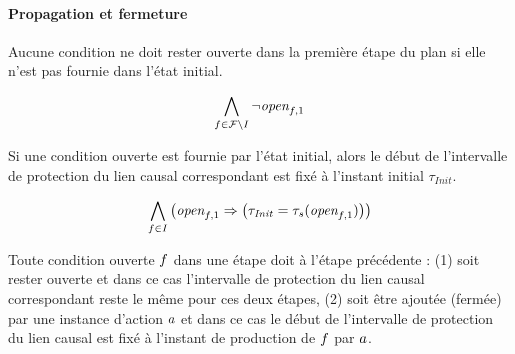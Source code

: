 \paragraph*{Propagation et fermeture}

Aucune condition ne doit rester ouverte dans la première étape du plan si elle n'est pas fournie dans l'état initial.

\begin{small}
\[
\Bigforall{\substack{\f\in \F\setminus \I}}\neg \open{\f}{1}%
\]
\end{small}

Si une condition ouverte est fournie par l'état initial, alors le début de l'intervalle de protection du lien causal correspondant est fixé à l'instant initial $\tau_{\textit{Init}}$.

\begin{small}
\[
\Bigforall{\substack{\f\in \I}}\left(\open{\f}{1} \Rightarrow \left(\tau_{\mathit{Init}} = \tau_{s}(\open{\f}{1})\right)\right)%
\]
\end{small}

Toute condition ouverte $f$ dans une étape doit à l'étape précédente : (1) soit rester ouverte et dans ce cas l'intervalle de protection du lien causal correspondant reste le même pour ces deux étapes, (2) soit être ajoutée (fermée) par une instance d'action $a$ et dans ce cas le début de l'intervalle de protection du lien causal est fixé à l'instant de production de $f$ par $a$.

